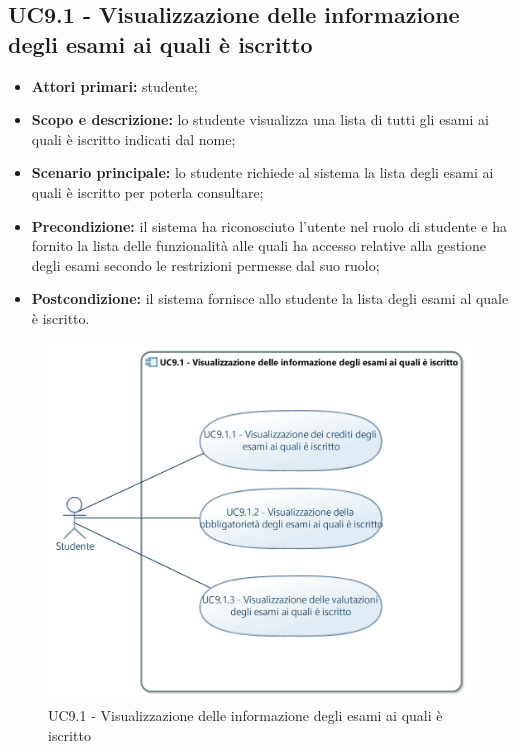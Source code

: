 \documentclass[AnalisiDeiRequisiti.tex]{subfiles}
\begin{document}
\subsection{UC9.1 - Visualizzazione delle informazione degli esami ai quali è iscritto}
\begin{itemize}
	\item \textbf{Attori primari:} studente;
	\item \textbf{Scopo e descrizione:} lo studente visualizza una lista di tutti gli esami ai quali è iscritto indicati dal nome;
	\item \textbf{Scenario principale:} lo studente richiede al sistema la lista degli esami ai quali è iscritto per poterla consultare;
	\item \textbf{Precondizione:} il sistema ha riconosciuto l'utente nel ruolo di studente e ha fornito la lista delle funzionalità alle quali ha accesso relative alla gestione degli esami secondo le restrizioni permesse dal suo ruolo; 
	\item \textbf{Postcondizione:} il sistema fornisce allo studente la lista degli esami al quale è iscritto.
\end{itemize}

\begin{figure}[H]
	\centering
	\includegraphics[width=1.0\linewidth]{UC9_1.jpg}
	\caption{UC9.1 - Visualizzazione delle informazione degli esami ai quali è iscritto}
	\label{fig:UC9.1 - Visualizzazione delle informazione degli esami ai quali 'e iscritto}
\end{figure}
\end{document}
